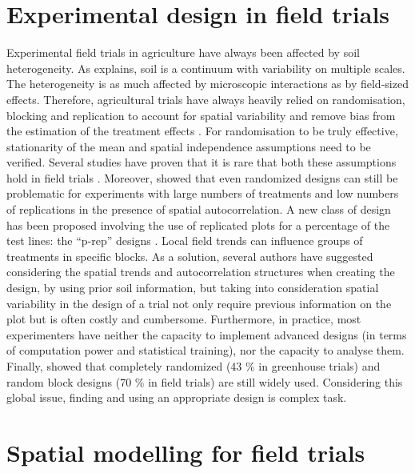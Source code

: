 \section{Experimental design in field trials}
Experimental field trials in agriculture have always been affected by soil heterogeneity. As \textcite{van_es_1.2_2002} explains, soil is a continuum with variability on multiple scales. 
The heterogeneity is as much affected by microscopic interactions as by field-sized effects. 
Therefore, agricultural trials have always heavily relied on randomisation, blocking and replication to account for spatial variability and remove bias from the estimation of the treatment effects \parencite{atkinson_one_2001}. 
For randomisation to be truly effective, stationarity of the mean and spatial independence assumptions need to be verified. Several studies have proven that it is rare that both these assumptions hold in field trials \parencite{davidoff_method_1986,nielsen_spatial_1973,iqbal_spatial_2005}. 
Moreover, \textcite{van_es_spatial_1993} showed that even randomized designs can still be problematic for experiments with large numbers of treatments and low numbers of replications in the presence of spatial autocorrelation. A new class of design has been proposed involving the use of replicated plots for a percentage of the test lines: the “p-rep” designs \parencite{cullis_design_2006,velazco_modelling_2017}.
Local field trends can influence groups of treatments in specific blocks. As a solution, several authors \parencite{watson_spatial_2000,fagroud_accounting_2002} have suggested considering the spatial trends and autocorrelation structures when creating the design, by using prior soil information, but taking into consideration spatial variability in the design of a trial not only require previous information on the plot but is often costly and cumbersome. 
Furthermore, in practice, most experimenters have neither the capacity to implement advanced designs (in terms of computation power and statistical training), nor the capacity to analyse them. 
Finally, \textcite{van_es_spatially-balanced_2007} showed that completely randomized (43 \% in greenhouse trials) and random block designs (70 \% in field trials) are still widely used.
Considering this global issue, finding and using an appropriate design is complex task.

\section{Spatial modelling for field trials}

